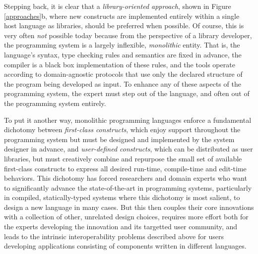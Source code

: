 Stepping back, it is clear that a \emph{library-oriented approach}, shown in Figure \ref{approaches}b, where new constructs are implemented entirely within a single host language as libraries, should be preferred when possible.
Of course, this is very often \emph{not} possible today because from the perspective of a library developer, the programming system is a largely inflexible, \emph{monolithic} entity. That is, the language's syntax, type checking rules and semantics are fixed in advance, the compiler is a black box implementation of these rules, and the tools operate according to domain-agnostic protocols that use only the declared structure of the program being developed as input. To enhance any of these aspects of the programming system, the expert must step out of the language, and often out of the programming system entirely. 

To put it another way, monolithic programming languages enforce a fundamental dichotomy between \emph{first-class constructs}, which enjoy support throughout the programming system but must be designed and implemented by the system designer in advance, and \emph{user-defined constructs}, which can be distributed as user libraries, but must creatively combine and repurpose the small set of available first-class constructs to express all desired run-time, compile-time and edit-time behaviors. This dichotomy has forced researchers and domain experts who want to significantly advance the state-of-the-art in programming systems, particularly in compiled, statically-typed systems where this dichotomy is most salient, to design a new language in many cases. But this then couples their core innovations with a collection of other, unrelated design choices, requires more effort both for the experts developing the innovation and its targetted user community, and leads to the intrinsic interoperability problems described above for users developing applications consisting of components written in different languages.

